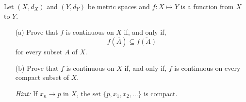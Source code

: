 
\begin{problem}[20pts]
  Let $(X,d_X)$ and $(Y,d_Y)$ be metric spaces and $f:X \mapsto Y$ is a function from $X$ to $Y$.
\begin{enumerate}

  \item[(a)] 
  Prove that $f$ is continuous on $X$ if, and only if,
\[
f(\overline{A}) \subseteq \overline{f(A)}
\]
for every subset $A$ of $X$.

  \item[(b)]  Prove that $f$ is continuous on $X$ if, and only if, $f$ is continuous on every compact subset of $X$.  

\textit{Hint:} If $x_n \to p$ in $X$, the set $\{p, x_1, x_2, \dots \}$ is compact.

 \end{enumerate}
\end{problem}